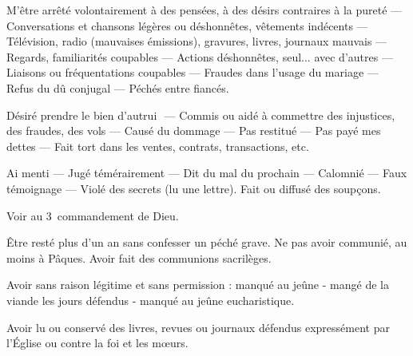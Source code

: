 
M’être arrêté volontairement à des pensées, à des désirs contraires à la pureté
— Conversations et chansons légères ou
déshonnêtes, vêtements indécents — Télévision, radio (mauvaises émissions),
gravures, livres, journaux mauvais — Regards, familiarités coupables — Actions
déshonnêtes, seul... avec d’autres —
Liaisons ou fréquentations coupables —
Fraudes dans l’usage du mariage — Refus
du dû conjugal — Péchés entre fiancés.


Désiré prendre le bien d’autrui ­ — Commis ou aidé à commettre des injustices,
des fraudes, des vols — Causé du dommage — Pas restitué — Pas payé mes dettes — Fait tort dans les ventes, contrats,
transactions, etc.


Ai menti — Jugé témérairement — Dit
du mal du prochain — Calomnié — Faux
témoignage — Violé des secrets (lu une
lettre). Fait ou diffusé des soupçons.




Voir au 3\ieme\ commandement de Dieu.


Être resté plus d'un an sans confesser un péché grave. Ne pas avoir communié, au moins à Pâques. Avoir fait des communions sacrilèges.


Avoir sans raison légitime et sans permission : manqué au jeûne - mangé de la viande les jours défendus - manqué au
jeûne eucharistique.


Avoir lu ou conservé des livres, revues ou journaux défendus expressément par l’Église ou contre la foi et les mœurs.


